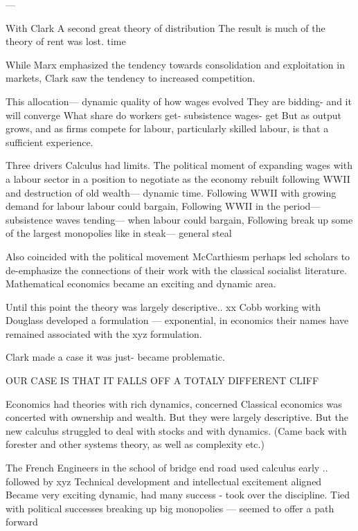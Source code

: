 ---


With Clark
A second great theory of distribution
The result is much of the theory of rent was lost. 
time

While Marx emphasized the tendency towards consolidation and exploitation in markets, Clark saw the tendency to increased competition. 

This allocation--- dynamic quality of how wages evolved
They are bidding- and it will converge 
What share do workers get- subsistence wages- get 
But as output grows, and as firms compete for labour, particularly skilled labour, is that a sufficient experience.



Three drivers
Calculus had limits.
The political moment of expanding wages with a labour sector in a position to negotiate as the economy rebuilt following WWII and destruction of old wealth--- dynamic time. 
Following WWII with growing demand for labour labour could bargain, 
Following WWII in the period--- subsistence waves tending--- when labour could bargain,
Following break up some of the largest monopolies like in steak--- general steal


Also coincided with the political movement McCarthiesm perhaps led scholars to de-emphasize the connections of their work with the classical socialist literature.
Mathematical economics became an exciting and dynamic area.

Until this point the theory was largely descriptive..
xx Cobb working with Douglass developed a formulation --- exponential, in economics their names have remained associated with the xyz formulation. 

Clark made a case it was just- became problematic.

OUR CASE IS THAT IT FALLS OFF A TOTALY DIFFERENT CLIFF



Economics had theories with rich dynamics, concerned 
Classical economics was concerted with ownership and wealth. But they were largely descriptive.
But the new calculus struggled to deal with stocks and with dynamics. 
(Came back with forester and other systems theory, as well as complexity etc.)

The French Engineers in the school of bridge end road used calculus early .. followed by xyz
Technical development and intellectual excitement aligned
Became very exciting dynamic, had many success - took over the discipline. 
Tied with political successes breaking up big monopolies --- seemed to offer a path forward


